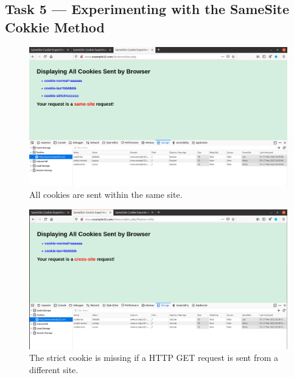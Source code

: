\subsection{Task 5 --- Experimenting with the SameSite Cokkie Method}
%
\begin{figure}
    \centering
    \includegraphics[height=\textheight,width=\textwidth,keepaspectratio]
    {figures/samesite_cookie_same.png}
    \caption{All cookies are sent within the same site.}
    \label{fig:samesite_cookie}
\end{figure}

\begin{figure}
    \centering
    \includegraphics[height=\textheight,width=\textwidth,keepaspectratio]
    {figures/samesite_cookie_get_crosssite.png}
    \caption{The strict cookie is missing if a HTTP GET request is sent
    from a different site.}
    \label{fig:crosssite_cookie_get}
\end{figure}

